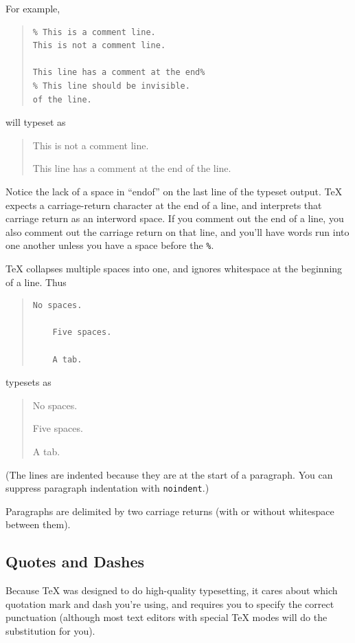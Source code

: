 \documentclass{icmmcm}
\newcommand{\bslash}{\symbol{'134}}%
\newcommand{\bsl}{{\texttt{\bslash}}}
\newcommand{\command}[1]{\texttt{\bsl{}#1}\xspace}
\newcommand{\tex}{\TeX\xspace}
\begin{document}
{For example,
\begin{quote}
\begin{verbatim}
% This is a comment line.
This is not a comment line.

This line has a comment at the end%
% This line should be invisible.
of the line.
\end{verbatim}
\end{quote}
will typeset as
\begin{quote}
This is not a comment line.

This line has a comment at the end%
of the line.
\end{quote}

Notice the lack of a space in ``endof'' on the last line of the
typeset output.  \tex expects a carriage-return character at the end
of a line, and interprets that carriage return as an interword space.
If you comment out the end of a line, you also comment out the
carriage return on that line, and you'll have words run into one
another unless you have a space before the \verb+%+.

\tex collapses multiple spaces into one, and ignores whitespace at the
beginning of a line.  Thus
\begin{quote}
\begin{verbatim}
No spaces.

    Five spaces.

    A tab.
\end{verbatim}
\end{quote}
typesets as
\begin{quote}
No spaces.

    Five spaces.

    A tab.
\end{quote}

(The lines are indented because they are at the start of a paragraph.
You can suppress paragraph indentation with \command{noindent}.)

Paragraphs are delimited by two carriage returns (with or without
whitespace between them).


\subsection{Quotes and Dashes}

Because \tex was designed to do high-quality typesetting, it cares
about which quotation mark and dash you're using, and requires you to
specify the correct punctuation (although most text editors with
special \tex modes will do the substitution for you).

}
\end{document}
